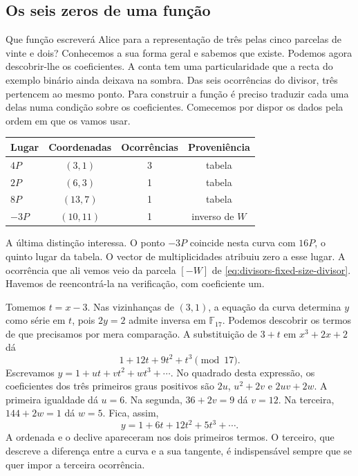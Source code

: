 \subsection{Os seis zeros de uma função}
\label{sec:divisors-seis-zeros}

Que função escreverá Alice para a representação de três pelas cinco
parcelas de vinte e dois? Conhecemos a sua forma geral e sabemos que
existe. Podemos agora descobrir-lhe os coeficientes. A conta tem uma
particularidade que a recta do exemplo binário ainda deixava na sombra.
Das seis ocorrências do divisor, três pertencem ao mesmo ponto. Para
construir a função é preciso traduzir cada uma delas numa condição
sobre os coeficientes. Comecemos por dispor os dados pela ordem em
que os vamos usar.
\begin{center}
\begin{tabular}{lccc}
 Lugar & Coordenadas & Ocorrências & Proveniência \\ \hline
 \(4P\) & \((3,1)\) & 3 & tabela \\
 \(2P\) & \((6,3)\) & 1 & tabela \\
 \(8P\) & \((13,7)\) & 1 & tabela \\
 \(-3P\) & \((10,11)\) & 1 & inverso de \(W\)
\end{tabular}
\end{center}
A última distinção interessa. O ponto \(-3P\) coincide nesta curva
com \(16P\), o quinto lugar da tabela. O vector de multiplicidades
atribuiu zero a esse lugar. A ocorrência que ali vemos veio da
parcela \([-W]\) de \eqref{eq:divisors-fixed-size-divisor}.
Havemos de reencontrá-la na verificação, com coeficiente um.

Tomemos \(t=x-3\). Nas vizinhanças de \((3,1)\), a equação da
curva determina \(y\) como série em \(t\), pois \(2y=2\) admite
inversa em \(\mathbb F_{17}\). Podemos descobrir os termos de que
precisamos por mera comparação. A substituição de \(3+t\) em
\(x^3+2x+2\) dá
\[
                 1+12t+9t^2+t^3\pmod {17}.
\]
Escrevamos \(y=1+ut+vt^2+wt^3+\cdots\). No quadrado desta
expressão, os coeficientes dos três primeiros graus positivos são
\(2u\), \(u^2+2v\) e \(2uv+2w\). A primeira igualdade dá
\(u=6\). Na segunda, \(36+2v=9\) dá \(v=12\).
Na terceira, \(144+2w=1\) dá \(w=5\). Fica, assim,
\begin{equation}
              y=1+6t+12t^2+5t^3+\cdots .
 \label{eq:divisors-six-local}
\end{equation}
A ordenada e o declive apareceram nos dois primeiros termos. O
terceiro, que descreve a diferença entre a curva e a sua tangente,
é indispensável sempre que se quer impor a terceira ocorrência.

